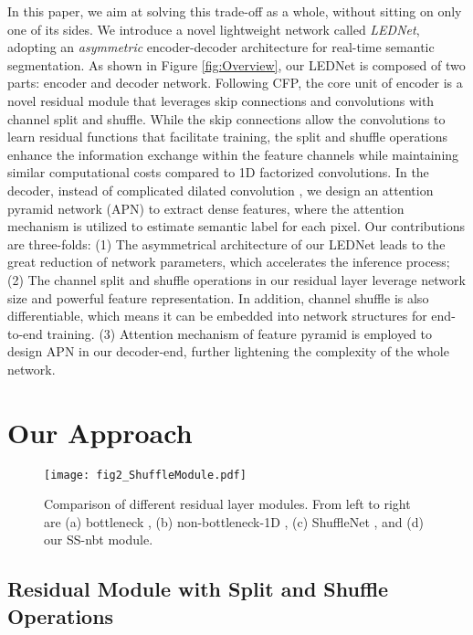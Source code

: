 \documentclass{article}
\begin{document}
In this paper, we aim at solving this trade-off as a whole, without sitting on only one of its sides. We introduce a novel lightweight network called \emph{LEDNet}, adopting an \emph{asymmetric} encoder-decoder architecture for real-time semantic segmentation. As shown in Figure \ref{fig:Overview}, our  LEDNet is composed of two parts: encoder and decoder network. Following CFP, the core unit of encoder is a novel residual module that leverages skip connections and convolutions with channel split and shuffle. While the skip connections allow the convolutions to learn residual functions that facilitate training, the split and shuffle operations enhance the information exchange within the feature channels while maintaining similar computational costs compared to 1D factorized convolutions. In the decoder, instead of complicated dilated convolution \cite{Mehta2018espnet}, we design an attention pyramid network (APN) to extract dense features, where the attention mechanism is utilized to estimate semantic label for each pixel. Our contributions are three-folds: (1) The asymmetrical architecture of our LEDNet leads to the great reduction of network parameters, which accelerates the inference process; (2) The channel split and shuffle operations in our residual layer leverage network size and powerful feature representation. In addition, channel shuffle is also differentiable, which means it can be embedded into network structures for end-to-end training. (3) Attention mechanism of feature pyramid is employed to design APN in our decoder-end, further lightening the complexity of the whole network.

\section{Our Approach}\label{sec:method}

\begin{figure}[!t]
\centerline{\texttt{[image: fig2\_ShuffleModule.pdf]}}
\caption{Comparison of different residual layer modules. From left to right are (a) bottleneck \cite{Paszke2016enet,Howard2017mobile}, (b) non-bottleneck-1D \cite{Romera2018erfnet}, (c) ShuffleNet \cite{zhang2018shuffle}, and (d) our SS-nbt module.} \label{fig:ShuffleModule}
\end{figure}



\subsection{Residual Module with Split and Shuffle Operations}
\end{document}
